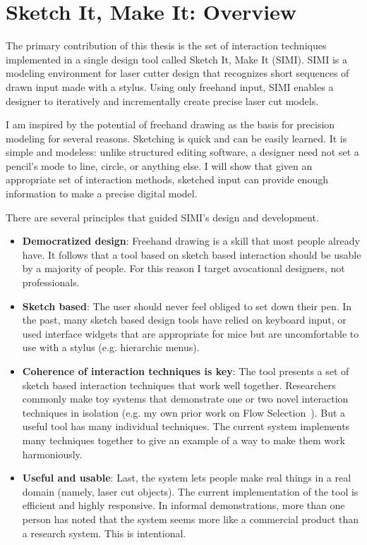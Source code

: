 \chapter{Sketch It, Make It: Overview}
\label{sec:overview}

The primary contribution of this thesis is the set of interaction
techniques implemented in a single design tool called Sketch It, Make
It (SIMI). SIMI is a modeling environment for laser cutter design that
recognizes short sequences of drawn input made with a stylus. Using
only freehand input, SIMI enables a designer to iteratively and
incrementally create precise laser cut models.

I am inspired by the potential of freehand drawing as the basis for
precision modeling for several reasons. Sketching is quick and can be
easily learned. It is simple and modeless: unlike structured editing
software, a designer need not set a pencil's mode to line, circle, or
anything else. I will show that given an appropriate set of
interaction methods, sketched input can provide enough information to
make a precise digital model.

There are several principles that guided SIMI's design and development.

\begin{itemize}
\item \textbf{Democratized design}: Freehand drawing is a skill that
  most people already have. It follows that a tool based on sketch
  based interaction should be usable by a majority of people. For this
  reason I target avocational designers, not professionals. 
\item \textbf{Sketch based}: The user should never feel obliged to set
  down their pen. In the past, many sketch based design tools have
  relied on keyboard input, or used interface widgets that are
  appropriate for mice but are uncomfortable to use with a stylus
  (e.g. hierarchic menus).
\item \textbf{Coherence of interaction techniques is key}: The tool
  presents a set of sketch based interaction techniques that work well
  together. Researchers commonly make toy systems that demonstrate one
  or two novel interaction techniques in isolation (e.g. my own prior
  work on Flow Selection~\cite{johnson-flow-selection}). But a useful
  tool has many individual techniques. The current system implements
  many techniques together to give an example of a way to make them
  work harmoniously.
\item \textbf{Useful and usable}: Last, the system lets people make
  real things in a real domain (namely, laser cut objects). The
  current implementation of the tool is efficient and highly
  responsive. In informal demonstrations, more than one person has
  noted that the system seems more like a commercial product than a
  research system. This is intentional.
\end{itemize}

